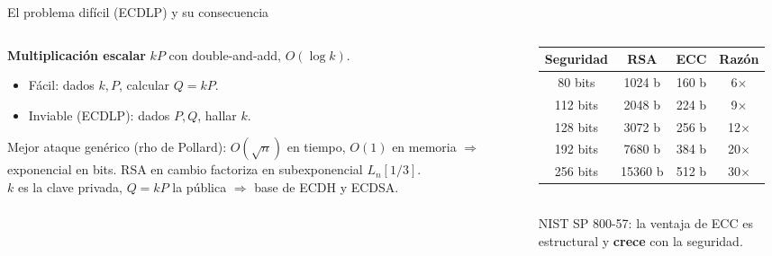 \documentclass[aspectratio=169,11pt]{beamer}
\begin{document}
\begin{frame}{El problema difícil (ECDLP) y su consecuencia}
  \small
  \begin{columns}[c]
    \begin{column}{0.46\textwidth}
      \textbf{Multiplicación escalar} $kP$ con double-and-add, $O(\log k)$.
      \begin{itemize}\footnotesize
        \item \alert{Fácil:} dados $k,P$, calcular $Q=kP$.
        \item \alert{Inviable (ECDLP):} dados $P,Q$, hallar $k$.
      \end{itemize}
      \footnotesize Mejor ataque genérico (rho de Pollard): $O(\sqrt{n})$ en tiempo,
      $O(1)$ en memoria $\Rightarrow$ \alert{exponencial en bits}. RSA en cambio factoriza
      en \alert{subexponencial} $L_n[1/3]$.\\[0.4ex]
      $k$ es la clave privada, $Q=kP$ la pública $\Rightarrow$ base de ECDH y ECDSA.
    \end{column}
    \begin{column}{0.54\textwidth}
      \centering
      \renewcommand{\arraystretch}{1.2}
      \footnotesize
      \begin{tabular}{cccc}
        \toprule
        \textbf{Seguridad} & \textbf{RSA} & \textbf{ECC} & \textbf{Razón} \\
        \midrule
        80 bits  & 1024 b  & 160 b & 6$\times$ \\
        112 bits & \alert{2048 b}  & 224 b & 9$\times$ \\
        128 bits & 3072 b  & 256 b & 12$\times$ \\
        192 bits & 7680 b  & 384 b & 20$\times$ \\
        256 bits & 15360 b & 512 b & 30$\times$ \\
        \bottomrule
      \end{tabular}
      \\[0.8ex]
      \footnotesize NIST SP 800-57: la ventaja de ECC es \alert{estructural} y
      \textbf{crece} con la seguridad.
    \end{column}
  \end{columns}
\end{frame}
\end{document}
